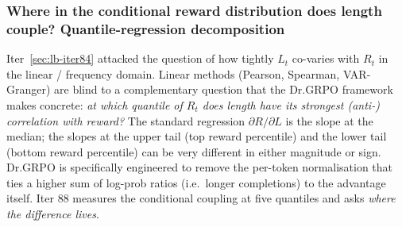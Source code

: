
\subsubsection{Where in the conditional reward distribution does length couple? Quantile-regression decomposition}\label{sec:lb-iter88}

Iter~\ref{sec:lb-iter84} attacked the question of how tightly $L_t$ co-varies
with $R_t$ in the linear / frequency domain. Linear methods (Pearson,
Spearman, VAR-Granger) are blind to a complementary question that the
Dr.GRPO framework makes concrete:
\emph{at which quantile of $R_t$ does length have its strongest (anti-)
correlation with reward?}  The standard regression $\partial R/\partial L$
is the slope at the median; the slopes at the upper tail (top reward
percentile) and the lower tail (bottom reward percentile) can be very
different in either magnitude or sign.  Dr.GRPO is specifically engineered
to remove the per-token normalisation that ties a higher sum of log-prob
ratios (i.e.\ longer completions) to the advantage itself.  Iter 88
measures the conditional coupling at five quantiles and asks
\emph{where the difference lives}.

